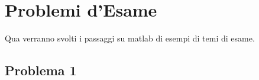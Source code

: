\documentclass[12pt]{article}
\begin{document}



\newpage
\section{Problemi d'Esame}
Qua verranno svolti i passaggi su matlab di esempi di temi di esame.

\subsection{Problema 1}
\end{document}
